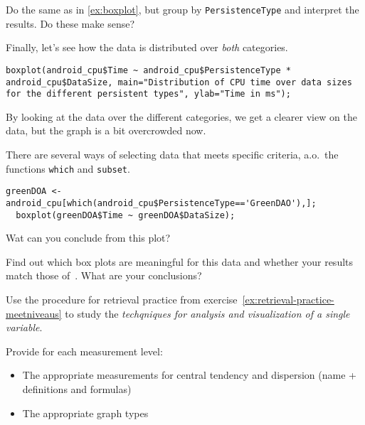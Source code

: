 \begin{exercise}
  Do the same as in \ref{ex:boxplot}, but group by \verb|PersistenceType| and interpret the results. Do these make sense?
\end{exercise}

Finally, let's see how the data is distributed over \emph{both} categories.

\begin{lstlisting}[breaklines=true]
  boxplot(android_cpu$Time ~ android_cpu$PersistenceType * android_cpu$DataSize, main="Distribution of CPU time over data sizes for the different persistent types", ylab="Time in ms");
\end{lstlisting}

By looking at the data over the different categories, we get a clearer view on the data, but the graph is a bit overcrowded now.

There are several ways of selecting data that meets specific criteria, a.o.~the functions \verb|which| and \verb|subset|.

\begin{lstlisting}[breaklines=true]
  greenDOA <- android_cpu[which(android_cpu$PersistenceType=='GreenDAO'),];
  boxplot(greenDOA$Time ~ greenDOA$DataSize);
\end{lstlisting}

\begin{exercise}
  Wat can you conclude from this plot?
\end{exercise}

\begin{exercise}
  Find out which box plots are meaningful for this data and whether your results match those of~\textcite{Akin2016}. What are your conclusions?
\end{exercise}

\begin{exercise}
  Use the procedure for retrieval practice from exercise~\ref{ex:retrieval-practice-meetniveaus} 
  to study the \emph{techqniques for analysis and visualization of a single variable}.
  
  Provide for each measurement level:
  
  \begin{itemize}
    \item The appropriate measurements for central tendency and dispersion (name + definitions and formulas)
    \item The appropriate graph types
  \end{itemize}
\end{exercise}




